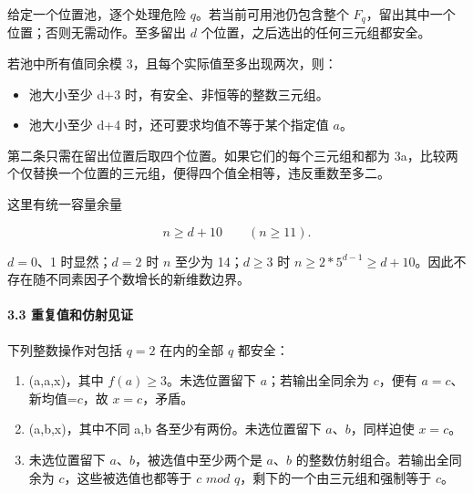 {给定一个位置池，逐个处理危险} {\ensuremath{q}。若当前可用池仍包含整个} {\ensuremath{F_{q}}，留出其中一个位置；否则无需动作。至多留出} {\ensuremath{d}} {个位置，之后选出的任何三元组都安全。}

{若池中所有值同余模} {3，且每个实际值至多出现两次，则：}

\begin{itemize}
\tightlist
\item
  {池大小至少} {d+3} {时，有安全、非恒等的整数三元组。}
\item
  {池大小至少} {d+4} {时，还可要求均值不等于某个指定值} {\ensuremath{a}。}
\end{itemize}

{第二条只需在留出位置后取四个位置。如果它们的每个三元组和都为} {3a，比较两个仅替换一个位置的三元组，便得四个值全相等，违反重数至多二。}

{这里有统一容量余量}

\[
\boxed{n\ge d+10\qquad(n\ge11).}
\tag{C33.1}
\]

{\ensuremath{d=0}、1} {时显然；\ensuremath{d=2}} {时} {\ensuremath{n}} {至少为} {14；\ensuremath{d\ge 3}} {时} {\ensuremath{n\ge 2*5^{d-1}\ge d+10}。因此不存在随不同素因子个数增长的新维数边界。}

\paragraph*{\texorpdfstring{{3.3} {重复值和仿射见证}}{3.3 重复值和仿射见证}}\label{C33-h216}

{下列整数操作对包括} {\ensuremath{q=2}} {在内的全部} {\ensuremath{q}} {都安全：}

\begin{enumerate}
\def\labelenumi{\arabic{enumi}.}
\tightlist
\item
  {(a,a,x)，其中} {\ensuremath{f(a)\ge 3}。未选位置留下} {\ensuremath{a}；若输出全同余为} {\ensuremath{c}，便有} {\ensuremath{a=c}、新均值=\ensuremath{c}，故} {\ensuremath{x=c}，矛盾。}
\item
  {(a,b,x)，其中不同} {a,b} {各至少有两份。未选位置留下} {\ensuremath{a}、\ensuremath{b}，同样迫使} {\ensuremath{x=c}。}
\item
  {未选位置留下} {\ensuremath{a}、\ensuremath{b}，被选值中至少两个是} {\ensuremath{a}、\ensuremath{b}} {的整数仿射组合。若输出全同余为} {\ensuremath{c}，这些被选值也都等于} {\ensuremath{c}} {\ensuremath{mod}} {\ensuremath{q}，剩下的一个由三元组和强制等于} {\ensuremath{c}。}
\end{enumerate}


